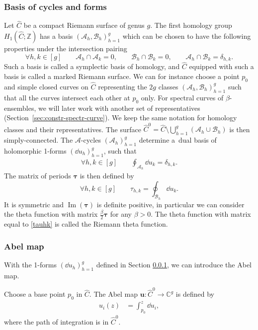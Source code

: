 \documentclass[pdftex]{sigma}
\numberwithin{equation}{section}
\newcommand{\C}{\mathbb{C}}
\newcommand{\A}{\mathcal{A}}
\newcommand{\B}{\mathcal{B}}
\begin{document}
\subsubsection{Basis of cycles and forms}
\label{sec:base-cycles-forms}
Let $\widehat{C}$ be a compact Riemann surface of genus $g$. The first
homology group $H_{1}(\widehat{C}; \mathbb{Z})$ has a basis $(\A_{h}, \B_{h})_{h = 1}^{g}$ which can be chosen to have the following properties under the intersection pairing
\begin{equation*}
 \forall h,k \in [g]\qquad \A_{h}\cap\A_{k} = 0,\qquad \B_{h}\cap\B_{k} = 0,\qquad \A_{h}\cap \B_{k} = \delta_{h,k}.
\end{equation*}
Such a basis is called a symplectic basis of homology, and $\widehat{C}$ equipped with such a basis is called a marked Riemann surface. We can for instance choose a point $p_{0}$ and simple closed curves on $\widehat{C}$ representing the $2g$ classes $(\A_{h}, \B_{h})_{h = 1}^g$
such that all the curves intersect each other at $p_{0}$ only. For spectral curves of $\beta$-ensembles, we will later work with another set of representatives (Section~\ref{sec:constr-spectr-curve}). We keep the same notation for homology classes and their representatives. The
surface $\widehat{C}^{0} = \widehat{C} \setminus \bigcup_{h=1}^{g}(\A_{h}\cup\B_{h})$ is
then simply-connected. The $\A$-cycles $(\A_h)_{h = 1}^{g}$ determine a~dual basis of holomorphic 1-forms
$(\dd u_{h})_{h = 1}^{g}$, such that
\begin{equation*}
 \begin{split}
\forall h,k \in [g]\qquad \oint_{\A_{h}}\dd u_{k} = \delta_{h,k}.
 \end{split}
\end{equation*}
The matrix of periods $\bm{\tau}$ is then defined by
\begin{equation}
\label{tauhk} \forall h,k \in [g] \qquad \tau_{h,k} = \oint_{\B_{h}}\dd u_{k}.
\end{equation}
It is symmetric and $\operatorname{Im}(\bm{\tau})$ is definite positive, in particular we can consider the theta function with matrix $\frac{\beta}{2} \bm{\tau}$ for any $\beta > 0$. The theta function with matrix equal to \eqref{tauhk} is called the Riemann theta function.



\subsubsection{Abel map}
\label{SecAbel} With the 1-forms $(\dd u_{h})_{h = 1}^{g}$ defined in Section
\ref{sec:base-cycles-forms}, we can introduce the Abel map.
\begin{Definition}
 Choose a base point $p_{0}$ in $\widehat{C}$. The Abel map
 $\bm{u} \colon \widehat{C}^{0} \to \C^{g}$ is defined by
 \begin{equation*}
 \begin{split}
 u_{i}(z) &= \int_{p_{0}}^{z}\dd u_{i},
 \end{split}
 \end{equation*}
 where the path of integration is in $\widehat{C}^0$.
 \end{Definition}
\end{document}
